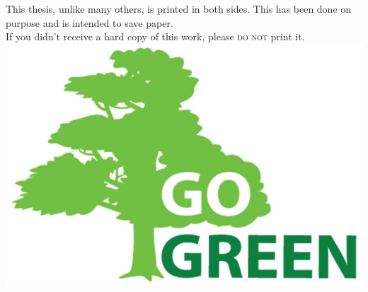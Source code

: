 \thispagestyle{empty}
{}

\vspace*{4cm}

\medskip

\begin{center}
    This thesis, unlike many others, is printed in both sides. This has been done on purpose and is intended to save paper. \\ \bigskip
    \bigskip
    If you didn't receive a hard copy of this work, please \textsc{do not} print it.\\ \bigskip \bigskip
    \includegraphics[width=.45\linewidth]{gfx/gogreen}
\end{center}